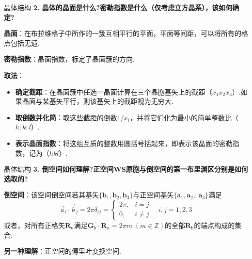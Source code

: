 \documentclass{beamer}
\begin{document}
\begin{frame}[t]{晶体结构}
    \textbf{2. 晶体的晶面是什么?密勒指数是什么（仅考虑立方晶系），该如何确定?} \par
    \vspace{0.1cm}
    \textbf{晶面}：在布拉维格子中所作的一簇互相平行的平面，平面等间距，可以将所有的格点包括无遗.\par
    \vspace{0.1cm}
    \textbf{密勒指数}：晶面指数，标定了晶面簇的方向.\par
    \vspace{0.1cm}
    \textbf{取法}：\par
    {\small  \vspace{-0.2cm}
    \begin{itemize}
    
        \item \textbf{确定截距}：在晶面簇中任选一晶面计算在三个晶胞基矢上的截距（$x_1 x_2 x_3$）.如果晶面与某基矢平行，则该基矢上的截距视为无穷大.

        \item \textbf{取倒数并化简}：取这些截距的倒数$1/x_i$，并将它们化为最小的简单整数比（$h:k:l$）.
        \item \textbf{表示晶面指数}：将这组互质的整数用圆括号括起来，即表示该晶面的密勒指数，记为（$hkl$）.
    \end{itemize}
    }
\end{frame}

\begin{frame}[t]{晶体结构}
    \textbf{3. 倒空间如何理解?正空间WS原胞与倒空间的第一布里渊区分别是如何选取的?}\par
    \vspace{0.1cm}
    \textbf{倒空间}：该空间倒空间若其基矢$ \{\boldsymbol{b}_1, \boldsymbol{b}_2, \boldsymbol{b}_3\} $与正空间基矢$ \{\boldsymbol{a}_1, \boldsymbol{a}_2,$ $ \boldsymbol{a}_3\} $满足
    \[
    \left.\vec{a}_i\cdot\vec{b}_j=2\pi\delta_{ij}=\left\{
    \begin{array}{cc}
        2\pi,& i=j\\
        0,& i\neq j
        \end{array}\right.\right.\quad i,j=1,2,3
    \]
    或者，对所有正格矢$\boldsymbol{R}_n$满足$ \boldsymbol{G}_{\text{h}} \cdot \boldsymbol{R}_{n}=2 \pi m \; (m\in\mathbb{Z}) $的全部$\boldsymbol{R}_{\text{h}}$的端点构成的集合.\par
    \vspace{0.1cm}
    \textbf{另一种理解}：正空间的傅里叶变换空间.
\end{frame}
\end{document}
